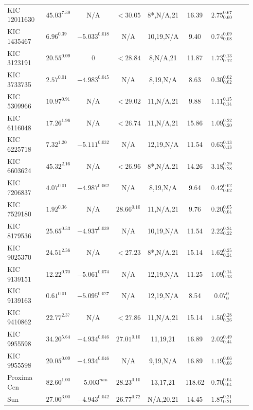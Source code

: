 \begin{appendices}
\begin{landscape}
\begin{longtable}{llccccccl}
KIC 12011630 & $45.03^{7.59}$   & N/A               & $<30.05$          & 8*,N/A,21     & 16.39  & $2.75_{0.60}^{0.67}$  \\
KIC 1435467  & $6.96^{0.39}$    & $-5.033^{0.018}$  & N/A               & 10,19,N/A     & 9.40   & $0.74_{0.08}^{0.09}$  \\
KIC 3123191  & $20.55^{0.09}$   & $0$               & $<28.84$          & 8,N/A,21      & 11.87  & $1.73_{0.12}^{0.13}$  \\
KIC 3733735  & $2.57^{0.01}$    & $-4.983^{0.045}$  & N/A               & 8,19,N/A      & 8.63   & $0.30_{0.02}^{0.02}$  \\
KIC 5309966  & $10.97^{0.91}$   & N/A               & $<29.02$          & 11,N/A,21     & 9.88   & $1.11_{0.14}^{0.15}$  \\
KIC 6116048  & $17.26^{1.96}$   & N/A               & $<26.74$          & 11,N/A,21     & 15.86  & $1.09_{0.20}^{0.22}$  \\
KIC 6225718  & $7.32^{1.20}$    & $-5.111^{0.032}$  & N/A               & 12,19,N/A     & 11.54  & $0.63_{0.13}^{0.13}$  \\
KIC 6603624  & $45.32^{2.16}$   & N/A               & $<26.96$          & 8*,N/A,21     & 14.26  & $3.18_{0.28}^{0.29}$  \\
KIC 7206837  & $4.07^{0.01}$    & $-4.987^{0.062}$  & N/A               & 8,19,N/A      & 9.64   & $0.42_{0.02}^{0.02}$  \\
KIC 7529180  & $1.92^{0.36}$    & N/A               & $28.66^{0.10}$    & 11,N/A,21     & 9.76   & $0.20_{0.04}^{0.05}$  \\
KIC 8179536  & $25.65^{0.53}$   & $-4.937^{0.039}$  & N/A               & 10,19,N/A     & 11.54  & $2.22_{0.22}^{0.24}$  \\
KIC 9025370  & $24.51^{2.56}$   & N/A               & $<27.23$          & 8*,N/A,21     & 15.14  & $1.62_{0.24}^{0.25}$  \\
KIC 9139151  & $12.22^{0.70}$   & $-5.061^{0.074}$  & N/A               & 12,19,N/A     & 11.25  & $1.09_{0.13}^{0.14}$  \\
KIC 9139163  & $0.61^{0.01}$    & $-5.095^{0.027}$  & N/A               & 12,19,N/A     & 8.54   & $0.07_{0}^{0}$        \\
KIC 9410862  & $22.77^{2.37}$   & N/A               & $<27.86$          & 11,N/A,21     & 15.14  & $1.50_{0.26}^{0.28}$  \\
KIC 9955598  & $34.20^{5.64}$   & $-4.934^{0.046}$  & $27.01^{0.10}$    & 11,19,21      & 16.89  & $2.02_{0.44}^{0.49}$  \\
KIC 9955598  & $20.05^{0.09}$   & $-4.934^{0.046}$  & N/A               & 9,19,N/A      & 16.89  & $1.19_{0.06}^{0.06}$  \\
Proxima Cen  & $82.60^{1.00}$   & $-5.003^{nan}$    & $28.23^{0.10}$    & 13,17,21      & 118.62 & $0.70_{0.04}^{0.04}$  \\
Sun          & $27.00^{3.00}$   & $-4.943^{0.042}$  & $26.77^{0.72}$    & N/A,20,21     & 14.45  & $1.87_{0.21}^{0.21}$  \\


\end{longtable}
\end{landscape}
\end{appendices}
